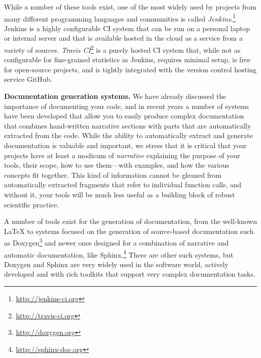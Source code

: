 \documentclass[ChapterTOCs,krantz2]{krantz} %
\newcommand{\blockpar}[1]{\vspace*{3mm} \noindent \textbf{#1}}
\begin{document}
While a number of these tools exist, one of the most widely used by projects
from many different programming languages and communities is called
\emph{Jenkins}.\footnote{\url{http://jenkins-ci.org}}  Jenkins is a highly
configurable CI system that can be run on a personal laptop or internal server
and that is available hosted in the cloud as a service from a variety of
sources.  \emph{Travis CI}\footnote{\url{http://travis-ci.org}} is a purely
hosted CI system that, while not as configurable for fine-grained statistics as
Jenkins, requires minimal setup, is free for open-source projects, and is
tightly integrated with the version control hosting service GitHub.

\blockpar{Documentation generation systems.} We have already discussed the
importance of documenting your code, and in recent years a number of systems
have been developed that allow you to easily produce complex documentation that
combines hand-written narrative sections with parts that are automatically
extracted from the code.  While the ability to automatically extract and
generate documentation is valuable and important, we stress that it is critical
that your projects have at least a modicum of \emph{narrative} explaining the
purpose of your tools, their scope, how to use them---with examples, and how
the various concepts fit together.  This kind of information cannot be gleaned
from automatically extracted fragments that refer to individual function calls,
and without it, your tools will be much less useful as a building block of
robust scientific practice.

A number of tools exist for the generation of documentation, from the
well-known \LaTeX{} to systems focused on the generation of source-based
documentation such as Doxygen\footnote{\url{http://doxygen.org}} and newer ones
designed for a combination of narrative and automatic documentation, like
Sphinx.\footnote{\url{http://sphinx-doc.org}}  There are other such systems,
but Doxygen and Sphinx are very widely used in the software world, actively
developed and with rich toolkits that support very complex documentation tasks.
\end{document}
